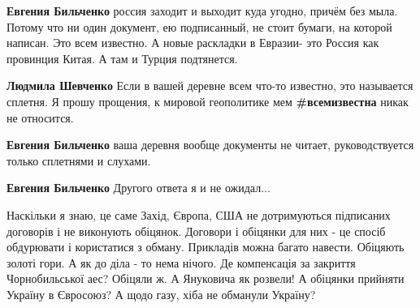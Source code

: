\begin{itemize}
\begin{itemize}
\begin{itemize}
\textbf{Евгения Бильченко} россия заходит и выходит куда угодно, причём без
мыла. Потому что ни один документ, ею подписанный, не стоит бумаги, на которой
написан. Это всем известно. А новые раскладки в Евразии- это Россия как
провинция Китая. А там и Турция подтянется.

 
\textbf{Людмила Шевченко} Если в вашей деревне всем что-то известно, это называется сплетня. Я прошу прощения, к мировой геополитике мем \textbf{\#всемизвестна} никак не относится.

 
\textbf{Евгения Бильченко} ваша деревня вообще документы не читает, руководствуется только сплетнями и слухами.

 
\textbf{Евгения Бильченко} Другого ответа я и не ожидал...

 

\obeycr
Наскільки я знаю, це саме Захід, Європа, США не дотримуються підписаних договорів і не виконують обіцянок.
Договори і обіцянки для них - це спосіб обдурювати і користатися з обману.
Прикладів можна багато навести.
Обіцяють золоті гори.
А як до діла - то нема нічого.
Де компенсація за закриття Чорнобильської аес?
Обіцяли ж.
А Януковича як розвели!
А обіцянки прийняти Україну в Євросоюз?
А щодо газу, хіба не обманули Україну?
\restorecr


 

\end{itemize}
\end{itemize}
\end{itemize}
